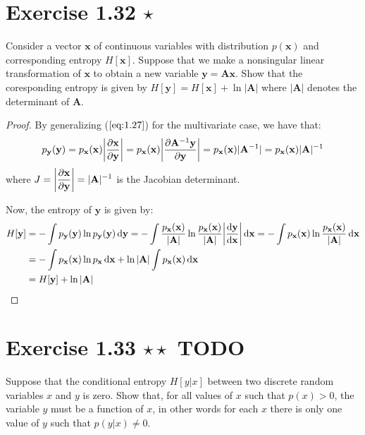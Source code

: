 \section*{Exercise 1.32 $\star$}
Consider a vector $\mathbf{x}$ of continuous variables with distribution
$p(\mathbf{x})$ and corresponding entropy $H[\mathbf{x}]$. Suppose
that we make a nonsingular linear transformation of $\mathbf{x}$ to
obtain a new variable $\mathbf{y} = \mathbf{Ax}$. Show that the coresponding
entropy is given by $H[\mathbf{y}] = H[\mathbf{x}] + \ln |\mathbf{A}|$ 
where $|\mathbf{A}|$ denotes the determinant of $\mathbf{A}$.

\begin{proof}
    By generalizing ($\ref{eq:1.27}$) for the multivariate case,
    we have that:
    \[
        p_\mathbf{y}(\mathbf{y}) 
        = p_\mathbf{x}(\mathbf{x}) \bigg|\pdv{\mathbf{x}}{\mathbf{y}}\bigg|
        = p_\mathbf{x}(\mathbf{x}) \bigg|\pdv{\mathbf{A}^{-1} \mathbf{y}}{\mathbf{y}}\bigg|
        = p_\mathbf{x}(\mathbf{x}) |\mathbf{A}^{-1}|
        = p_\mathbf{x}(\mathbf{x}) |\mathbf{A}|^{-1}
    \] 
    where $J = \displaystyle\bigg|\pdv{\mathbf{x}}{\mathbf{y}}\bigg| = |\mathbf{A}|^{-1}$ 
    is the Jacobian determinant.
    
    Now, the entropy of $\mathbf{y}$ is given by:
    \begin{align*}
        H[\mathbf{y}] 
        &= -\int p_\mathbf{y}(\mathbf{y}) \ln p_\mathbf{y}(\mathbf{y}) \mathop{}\!\mathrm{d} \mathbf{y}
        = -\int \frac{p_\mathbf{x}(\mathbf{x})}{|\mathbf{A}|} 
        \ln \frac{p_\mathbf{x}(\mathbf{x})}{|\mathbf{A}|} \bigg| \frac{\mathrm{d}\mathbf{y}}{\mathrm{d}\mathbf{x}}\bigg| \mathop{}\!\mathrm{d} \mathbf{x}
        = -\int p_{\mathbf{x}}(\mathbf{x})
        \ln \frac{p_\mathbf{x}(\mathbf{x})}{|\mathbf{A}|} \mathop{}\!\mathrm{d} \mathbf{x} \\
        &= -\int p_\mathbf{x}(\mathbf{x}) \ln p_\mathbf{x} \mathop{}\!\mathrm{d} \mathbf{x} 
        + \ln |\mathbf{A}| \int p_\mathbf{x}(\mathbf{x}) \mathop{}\!\mathrm{d} \mathbf{x} \\
        &= H[\mathbf{y}] + \ln |\mathbf{A}|
    \end{align*}
\end{proof}

\section*{Exercise 1.33 $\star \star$ TODO}
Suppose that the conditional entropy $H[y | x]$ between
two discrete random variables $x$ and $y$ is zero. Show that,
for all  values of $x$ such that $p(x) > 0$, the variable $y$ 
must be a function of $x$, in other words for each $x$ there is
only one value of $y$ such that $p(y | x) \neq 0$.

